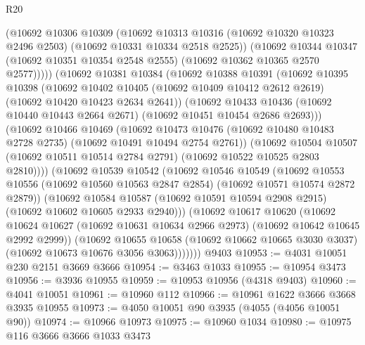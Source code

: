 \begin{lexlean}{R20}
\begin{coremodule}
            (@10692
              @10306
              @10309
              (@10692
                @10313
                @10316
                (@10692 @10320 @10323 @2496 @2503)
                (@10692 @10331 @10334 @2518 @2525))
              (@10692
                @10344
                @10347
                (@10692 @10351 @10354 @2548 @2555)
                (@10692 @10362 @10365 @2570 @2577)))))
        (@10692
          @10381
          @10384
          (@10692
            @10388
            @10391
            (@10692
              @10395
              @10398
              (@10692
                @10402
                @10405
                (@10692 @10409 @10412 @2612 @2619)
                (@10692 @10420 @10423 @2634 @2641))
              (@10692
                @10433
                @10436
                (@10692 @10440 @10443 @2664 @2671)
                (@10692 @10451 @10454 @2686 @2693)))
            (@10692
              @10466
              @10469
              (@10692
                @10473
                @10476
                (@10692 @10480 @10483 @2728 @2735)
                (@10692 @10491 @10494 @2754 @2761))
              (@10692
                @10504
                @10507
                (@10692 @10511 @10514 @2784 @2791)
                (@10692 @10522 @10525 @2803 @2810))))
          (@10692
            @10539
            @10542
            (@10692
              @10546
              @10549
              (@10692
                @10553
                @10556
                (@10692 @10560 @10563 @2847 @2854)
                (@10692 @10571 @10574 @2872 @2879))
              (@10692
                @10584
                @10587
                (@10692 @10591 @10594 @2908 @2915)
                (@10692 @10602 @10605 @2933 @2940)))
            (@10692
              @10617
              @10620
              (@10692
                @10624
                @10627
                (@10692 @10631 @10634 @2966 @2973)
                (@10692 @10642 @10645 @2992 @2999))
              (@10692
                @10655
                @10658
                (@10692 @10662 @10665 @3030 @3037)
                (@10692 @10673 @10676 @3056 @3063)))))))
    @9403
@10953 := @4031 @10051 @230 @2151 @3669 @3666
@10954 := @3463 @1033
@10955 := @10954 @3473
@10956 := @3936 @10955
@10959 := @10953 @10956 (@4318 @9403)
@10960 := @4041 @10051
@10961 := @10960 @112
@10966 := @10961 @1622 @3666 @3668 @3935 @10955
@10973 := @4050 @10051 @90 @3935 (@4055 (@4056 @10051 @90))
@10974 := @10966 @10973
@10975 := @10960 @1034
@10980 := @10975 @116 @3666 @3666 @1033 @3473

\end{coremodule}
\end{lexlean}
